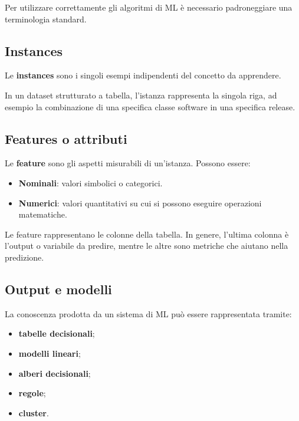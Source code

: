 Per utilizzare correttamente gli algoritmi di ML è necessario padroneggiare una terminologia standard.

\subsection{Instances}

Le \textbf{instances} sono i singoli esempi indipendenti del concetto da apprendere.

\begin{notaprof}
In un dataset strutturato a tabella, l'istanza rappresenta la singola riga, ad esempio la combinazione di una specifica classe software in una specifica release.
\end{notaprof}

\subsection{Features o attributi}

Le \textbf{feature} sono gli aspetti misurabili di un'istanza. Possono essere:
\begin{itemize}
    \item \textbf{Nominali}: valori simbolici o categorici.
    \item \textbf{Numerici}: valori quantitativi su cui si possono eseguire operazioni matematiche.
\end{itemize}

\begin{notaprof}
Le feature rappresentano le colonne della tabella. In genere, l'ultima colonna è l'output o variabile da predire, mentre le altre sono metriche che aiutano nella predizione.
\end{notaprof}

\subsection{Output e modelli}

La conoscenza prodotta da un sistema di ML può essere rappresentata tramite:
\begin{itemize}
    \item \textbf{tabelle decisionali};
    \item \textbf{modelli lineari};
    \item \textbf{alberi decisionali};
    \item \textbf{regole};
    \item \textbf{cluster}.
\end{itemize}

